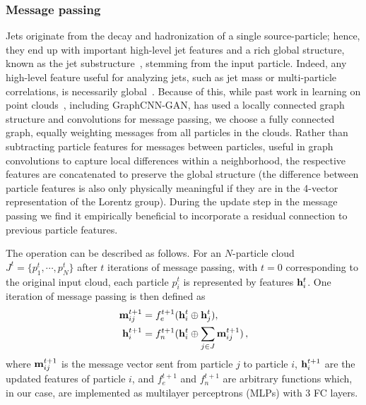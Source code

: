 \subsubsection{Message passing}

Jets originate from the decay and hadronization of a single source-particle; hence, they end up with important high-level jet features and a rich global structure, known as the jet substructure~\cite{larkoski2020jet}, stemming from the input particle.
Indeed, any high-level feature useful for analyzing jets, such as jet mass or multi-particle correlations, is necessarily global~\cite{Komiske:2017aww}.
Because of this, while past work in learning on point clouds~\cite{dynamicgraphcnn, monti2017geometric, Qu:2019gqs}, including GraphCNN-GAN, has used a locally connected graph structure and convolutions for message passing, we choose a fully connected graph, equally weighting messages from all particles in the clouds.
Rather than subtracting particle features for messages between particles, useful in graph convolutions to capture local differences within a neighborhood, the respective features are concatenated to preserve the global structure (the difference between particle features is also only physically meaningful if they are in the 4-vector representation of the Lorentz group).
During the update step in the message passing we find it empirically beneficial to incorporate a residual connection to previous particle features.

The operation can be described as follows.
For an $N$-particle cloud $J^t = \{p_1^t, \cdots, p_N^t\}$ after $t$ iterations of message passing, with $t=0$ corresponding to the original input cloud, each particle $p^t_i$ is represented by features $\mathbf{h}^t_i$.
One iteration of message passing is then defined as
\begin{align}
        \label{eqn:mpm} \mathbf{m}^{t+1}_{ij} &= f_e^{t+1}(\mathbf{h}^t_i \oplus \mathbf{h}^t_j), \\
        \label{eqn:mph} \mathbf{h}^{t+1}_i &= f_n^{t+1}(\mathbf{h}^t_i \oplus \sum_{j \in J} \mathbf{m}^{t+1}_{ij})\,,
\end{align}
where $\mathbf{m}^{t+1}_{ij}$ is the message vector sent from particle $j$ to particle $i$, $\mathbf{h}^{t+1}_i$ are the updated features of particle $i$, and $f_e^{t+1}$ and $f_n^{t+1}$ are arbitrary functions which, in our case, are implemented as multilayer perceptrons (MLPs) with 3 FC layers.


